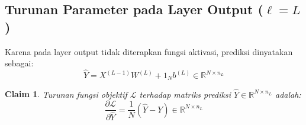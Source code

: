 \documentclass[11pt,a4paper]{article}
\def\mathbf#1{#1}%
\theoremstyle{plain}
\newtheorem{claim}{Claim}[section]
\theoremstyle{definition}
\theoremstyle{remark}
\begin{document}
\subsection{Turunan Parameter pada Layer Output (\texorpdfstring{$\ell = L$}{l = L})}
\label{subsec:gradien_layer_L}

Karena pada layer output tidak diterapkan fungsi aktivasi, prediksi dinyatakan sebagai:
\begin{equation}
    \hat{Y} = X^{(L-1)} W^{(L)} + \mathbf{1}_N \mathbf{b}^{(L)} \in \mathbb{R}^{N \times n_L} \label{eq:pred_output_L}
\end{equation}

\begin{claim}
Turunan fungsi objektif $\mathcal{L}$ terhadap matriks prediksi $\hat{Y} \in \mathbb{R}^{N \times n_L}$ adalah:
\begin{equation}
    \frac{\partial \mathcal{L}}{\partial \hat{Y}} = \frac{1}{N} (\hat{Y} - Y) \in \mathbb{R}^{N \times n_L} \label{eq:claim_dL_dYhat}
\end{equation}
\end{claim}
\end{document}
